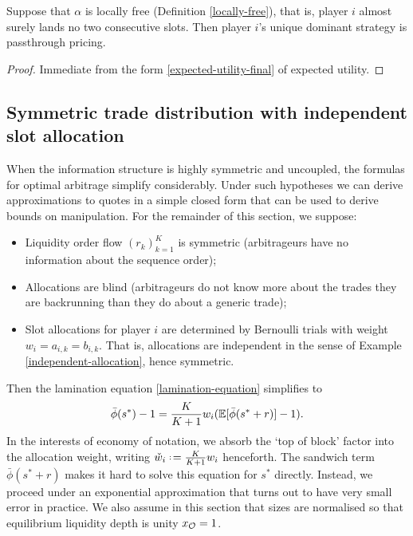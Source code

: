 \begin{corollary} \label{dominant-strategy-passthrough} \label{theorem-myopic}

  Suppose that $\alpha$ is locally free (Definition \ref{locally-free}), that is, player $i$ almost surely lands no two consecutive slots.
  Then player $i$'s unique dominant strategy is passthrough pricing.

\end{corollary}
%
\begin{proof}

  Immediate from the form \eqref{expected-utility-final} of expected utility. \qedhere

\end{proof}

\subsection{Symmetric trade distribution with independent slot allocation}

When the information structure is highly symmetric and uncoupled, the formulas for optimal arbitrage simplify considerably.
%
Under such hypotheses we can derive approximations to quotes in a simple closed form that can be used to derive bounds on manipulation.
%
For the remainder of this section, we suppose:
\begin{itemize}
  \item Liquidity order flow $(r_k)_{k=1}^K$ is symmetric (arbitrageurs have no information about the sequence order);
  \item Allocations are blind (arbitrageurs do not know more about the trades they are backrunning than they do about a generic trade);
  \item Slot allocations for player $i$ are determined by Bernoulli trials with weight $w_i=a_{i,k}=b_{i,k}$. 
  That is, allocations are independent in the sense of Example \ref{independent-allocation}, hence symmetric.
\end{itemize}
Then the lamination equation \eqref{lamination-equation} simplifies to
\begin{equation}
  \bar\phi({s^*}) - 1 = \frac{K}{K+1} w_i(\mathbb{E}[\bar\phi({s^*}+r)]- 1). \label{optimization-symmetric}
\end{equation}
In the interests of economy of notation, we absorb the `top of block' factor into the allocation weight, writing $\check{w}_i\defeq \frac{K}{K+1} w_i$ henceforth.
%
The sandwich term $\bar\phi(s^*+r)$ makes it hard to solve this equation for ${s^*}$ directly.
%
Instead, we proceed under an exponential approximation that turns out to have very small error in practice.
%
We also assume in this section that sizes are normalised so that equilibrium liquidity depth is unity $x_{\mathcal{O}}=1$.

